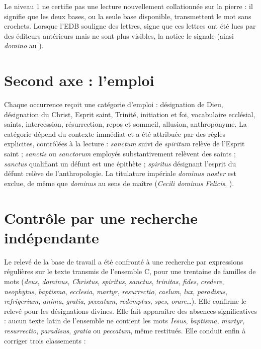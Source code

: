 Le niveau 1 ne certifie pas une lecture nouvellement collationnée sur la pierre : il signifie que les deux bases, ou la seule base disponible, transmettent le mot sans crochets. Lorsque l’EDB souligne des lettres, signe que ces lettres ont été lues par des éditeurs antérieurs mais ne sont plus visibles, la notice le signale (ainsi \emph{domino} au ).

\section{Second axe : l’emploi}

Chaque occurrence reçoit une catégorie d’emploi : désignation de Dieu, désignation du Christ, Esprit saint, Trinité, initiation et foi, vocabulaire ecclésial, saints, intercession, résurrection, repos et sommeil, allusion, anthroponyme. La catégorie dépend du contexte immédiat et a été attribuée par des règles explicites, contrôlées à la lecture : \emph{sanctum} suivi de \emph{spiritum} relève de l’Esprit saint ; \emph{sanctis} ou \emph{sanctorum} employés substantivement relèvent des saints ; \emph{sanctus} qualifiant un défunt est une épithète ; \emph{spiritus} désignant l’esprit du défunt relève de l’anthropologie. La titulature impériale \emph{dominus noster} est exclue, de même que \emph{dominus} au sens de maître (\emph{Cecili dominus Felicis}, ).

\section{Contrôle par une recherche indépendante}

Le relevé de la base de travail a été confronté à une recherche par expressions régulières sur le texte transmis de l’ensemble C, pour une trentaine de familles de mots (\emph{deus}, \emph{dominus}, \emph{Christus}, \emph{spiritus}, \emph{sanctus}, \emph{trinitas}, \emph{fides}, \emph{credere}, \emph{neophytus}, \emph{baptisma}, \emph{ecclesia}, \emph{martyr}, \emph{resurrectio}, \emph{caelum}, \emph{lux}, \emph{paradisus}, \emph{refrigerium}, \emph{anima}, \emph{gratia}, \emph{peccatum}, \emph{redemptus}, \emph{spes}, \emph{orare}…). Elle confirme le relevé pour les désignations divines. Elle fait apparaître des absences significatives : aucun texte latin de l’ensemble ne contient les mots \emph{Iesus}, \emph{baptisma}, \emph{martyr}, \emph{resurrectio}, \emph{paradisus}, \emph{gratia} ou \emph{peccatum}, même restitués. Elle conduit enfin à corriger trois classements :

